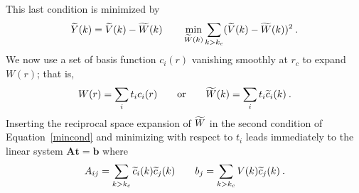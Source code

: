 This last condition is minimized by
\begin{equation}
\widetilde{Y}(k)=\widetilde{V}(k)-\widetilde{W}(k)\qquad \min_{\widetilde{W}(k)}\sum_{k>k_c}(\widetilde{V}(k)-\widetilde{W}(k))^2
\label{mincond}\:.
\end{equation}
We now use a set of basis function $c_i(r)$ vanishing smoothly at $r_c$
to expand $W(r)$; that is,
\begin{equation}
W(r)=\sum_i t_i c_i(r)\qquad\text{or}\qquad \widetilde{W}(k)=\sum_i t_i \widetilde{c}_i(k)\:.
\end{equation}
Inserting the reciprocal space expansion of $\widetilde{W}$ in the second condition of
Equation~\ref{mincond} and minimizing with respect to $t_i$ leads immediately
to the linear system $\mathbf{A}\mathbf{t}=\mathbf{b}$ where
\begin{eqnarray}
A_{ij}=\sum_{k>k_c}\widetilde{c}_i(k)\widetilde{c}_j(k)\qquad b_j=\sum_{k>k_c} V(k) \widetilde{c}_j(k)
\label{matrix_elements}\:.
\end{eqnarray}

